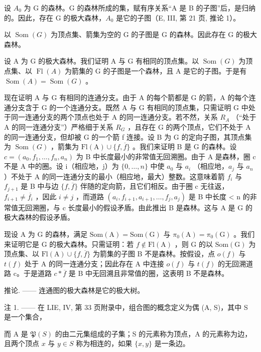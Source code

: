 设 \(A_{0}\) 为 G 的森林。G 的森林所成的集，赋有序关系“A 是 B 的子图”后，是归纳的。因此，存在 G 的极大森林，\(A_{0}\) 是它的子图（E, III, 第 21 页, 推论 1）。

以 \(\operatorname{Som}(G)\) 为顶点集、箭集为空的 G 的子图是 G 的森林。因此存在 G 的极大森林。

设 A 为 G 的极大森林。我们证明 A 与 G 有相同的顶点集。以 \(\operatorname{Som}(G)\) 为顶点集、以 \(\operatorname{Fl}(A)\) 为箭集的 G 的子图是一个森林，且 A 是它的子图。于是有 \(\operatorname{Som}(A) = \operatorname{Som}(G)\) 。

现在证明 A 与 G 有相同的连通分支。由于 A 的每个箭都是 G 的箭，A 的每个连通分支含于 G 的一个连通分支。既然 A 与 G 有相同的顶点集，只需证明 G 中处于同一连通分支的两个顶点也处于 A 的同一连通分支。若不然，关系 \(R_{A}\) （“处于 A 的同一连通分支”）严格细于关系 \(R_{G}\) ，且存在 G 的两个顶点，它们不处于 A 的同一连通分支，但却被 G 的一个箭 f 连接。设 B 为 G 的定向子图，其顶点集为 \(\operatorname{Som}(G)\) ，箭集为 \(\mathrm{Fl(A)} \cup \{f, \overline{f}\}\) 。我们来证明 B 是 G 的森林。设 \(c = (a_{0}, f_{1}, \ldots, f_{n}, a_{n})\) 为 B 中长度最小的非常值无回溯圈。由于 A 是森林，圈 c 不是 A 中的圈。设 i（相应地，j）为 \(\{0, \ldots, n\}\) 中使 \(a_{0}\) 与 \(a_{i}\) （相应地，\(a_{j}\) 与 \(a_{n}\) ）不处于 A 的同一连通分支的最小（相应地，最大）整数。这意味着箭 \(f_{i}\) 与 \(f_{j+1}\) 是 B 中与边 \(\{f, \overline{f}\}\) 伴随的定向箭，且它们相反。由于圈 c 无往返，\(f_{i+1} \neq \overline{f_{i}}\) ，因此 \(i \neq j\) ，而道路 \((a_{i}, f_{i+1}, a_{i+1}, \ldots, f_{j}, a_{j})\) 是 B 中长度 < n 的非常值无回溯圈，与 c 长度最小的假设矛盾。由此推出 B 是森林。这与 A 是 G 的极大森林的假设矛盾。

现设 A 为 G 的森林，满足 \(\mathrm{Som}(\mathrm{A}) = \mathrm{Som}(\mathrm{G})\) 与 \(\pi_{0}(\mathrm{A}) = \pi_{0}(\mathrm{G})\) 。我们来证明它是 G 的极大森林。只需证明：若 \(f \notin \mathrm{Fl}(\mathrm{A})\) ，则 G 的以 \(\mathrm{Som}(\mathrm{G})\) 为顶点集、以 \(\mathrm{Fl}(\mathrm{A}) \cup \{f, \overline{f}\}\) 为箭集的子图 B 不是森林。按假设，点 \(o(f)\) 与 \(t(f)\) 处于 A 的同一连通分支；因此存在 A 中连接 \(o(f)\) 与 \(t(f)\) 的无回溯道路 c。于是道路 \(c * \overline{f}\) 是 B 中无回溯且非常值的圈，这表明 B 不是森林。

推论. —— 连通图的极大森林是它的极大树。

注 1. —— 在 LIE, IV, 第 33 页附录中，组合图的概念定义为偶 (A, S)，其中 S 是一个集合，

而 A 是 \(\mathfrak{P}(S)\) 的由二元集组成的子集；S 的元素称为顶点，A 的元素称为边，且两个顶点 \(x\) 与 \(y \in S\) 称为相连的，如果 \(\{x, y\}\) 是一条边。

